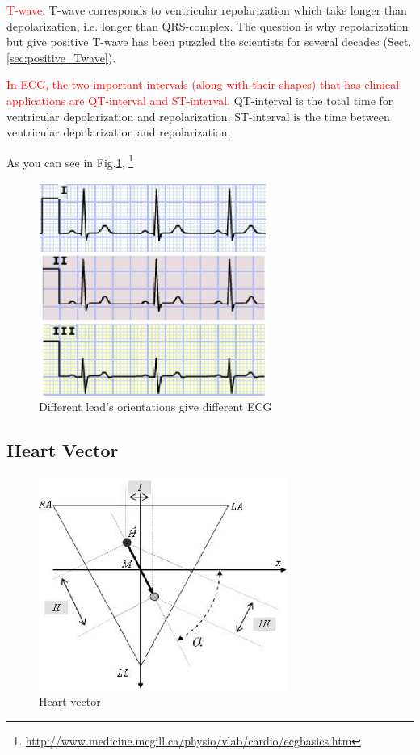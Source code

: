 \textcolor{red}{T-wave}: T-wave corresponds to ventricular repolarization which
take longer than depolarization, i.e. longer than QRS-complex. The question is
why repolarization but give positive T-wave has been puzzled the scientists for
several decades (Sect.\ref{sec:positive_Twave}).

\textcolor{red}{In ECG, the two important intervals (along with their shapes)
that has clinical applications are QT-interval and ST-interval}. QT-interval is
the total time for ventricular depolarization and repolarization. ST-interval is
the time between ventricular depolarization and repolarization.

As you can see in Fig.\ref{fig:ECG_3leads},
\footnote{\url{http://www.medicine.mcgill.ca/physio/vlab/cardio/ecgbasics.htm}}


\begin{figure}[hbt]
  \centerline{\includegraphics[height=7cm,
    angle=0]{./images/ECG_3leads.eps}}
  \caption{Different lead's orientations give different ECG}
  \label{fig:ECG_3leads}
\end{figure}

\subsection{Heart Vector}
\label{sec:heart_vector}


\begin{figure}[hbt]
  \centerline{\includegraphics[height=7cm,
    angle=0]{./images/heart_vector.eps}}
  \caption{Heart vector}
  \label{fig:heart_vector}
\end{figure}

